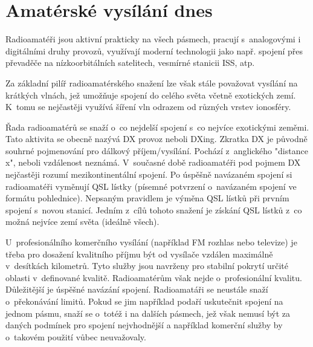 \section{Amatérské vysílání dnes}
\label{radioamateri_dnes}

Radioamatéři jsou aktivní prakticky na všech pásmech, pracují s~analogovými i
digitálními druhy provozů, využívají moderní technologii jako např. spojení přes
převaděče na nízkoorbitálních satelitech, vesmírné stanicii ISS, atp. 

Za základní pilíř radioamatérského snažení lze však stále považovat vysílání na
krátkých vlnách, jež umožňuje spojení do celého světa včetně exotických zemí.
K~tomu se nejčastěji využívá šíření vln odrazem od různých vrstev ionosféry.

Řada radioamatérů se snaží o~co nejdelší spojení s~co nejvíce exotickými zeměmi.
Tato aktivita se obecně nazývá DX provoz neboli DXing. Zkratka DX je původně souhrné pojmenování
pro dálkový příjem/vysílání. Pochází z~anglického "distance
x", neboli vzdálenost neznámá. V~současné době radioamatéři pod pojmem DX
nejčastěji rozumí mezikontinentální spojení.
Po úspěšně navázaném spojení si radioamatéři vyměnují QSL lístky (písemné potvrzení
o~navázaném spojení ve formátu pohlednice). Nepsaným pravidlem je výměna QSL
lístků při prvním spojení s~novou stanicí. Jedním z~cílů tohoto snažení je
získání QSL lístků z~co možná nejvíce zemí světa (ideálně všech).

U~profesionálního komerčního vysílání (například FM rozhlas nebo
televize) je třeba pro dosažení kvalitního příjmu být od vysílače vzdálen maximálně
v~desítkách kilometrů. Tyto služby jsou navrženy pro stabilní pokrytí určité
oblasti v~definované kvalitě. Radioamatérům však nejde o~profesionální kvalitu.
Důležitější je úspěšné navázání spojení. Radioamatáři se neustále snaží o~překonávání limitů.
Pokud se jim například podaří uskutečnit spojení na jednom pásmu,
snaží se o~totéž i na dalších pásmech, jež však nemusí být za daných
podmínek pro spojení nejvhodnější a například komerční služby by o~takovém
použití vůbec neuvažovaly.

